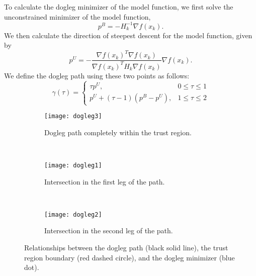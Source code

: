 To calculate the dogleg minimizer of the model function, we first solve the unconstrained minimizer of the model function,
\[
p^B = -H_k^{-1}\nabla f(x_k).
\]
We then calculate the direction of steepest descent for the model function, given by
\[
p^U = -\frac{\nabla f(x_k)^T\nabla f(x_k)}{\nabla f(x_k)^TH_k\nabla f(x_k)}\nabla f(x_k).
\]
We define the dogleg path using these two points as follows:
\[
\gamma(\tau) =  \left\{
     \begin{array}{lr}
       \tau p^U, & 0\leq \tau \leq 1\\
       p^U+(\tau-1)(p^B-p^U), & 1\leq \tau\leq 2
     \end{array}
   \right.
\]

\begin{figure}
\centering
    \begin{subfigure}[b]{0.3\textwidth}
            \texttt{[image: dogleg3]}
            \caption{Dogleg path completely within the trust region.}
            \label{fig:dl3}
    \end{subfigure}%
    ~ %
    \begin{subfigure}[b]{0.3\textwidth}
            \texttt{[image: dogleg1]}
            \caption{Intersection in the first leg of the path.}
            \label{fig:dl1}
    \end{subfigure}
    ~ %
    \begin{subfigure}[b]{0.3\textwidth}
            \texttt{[image: dogleg2]}
            \caption{Intersection in the second leg of the path.}
            \label{fig:dl2}
    \end{subfigure}
    \caption{Relationships between the dogleg path (black solid line),
    the trust region boundary (red dashed circle), and the dogleg minimizer (blue dot).}
    \label{fig:dogleg}
\end{figure}

